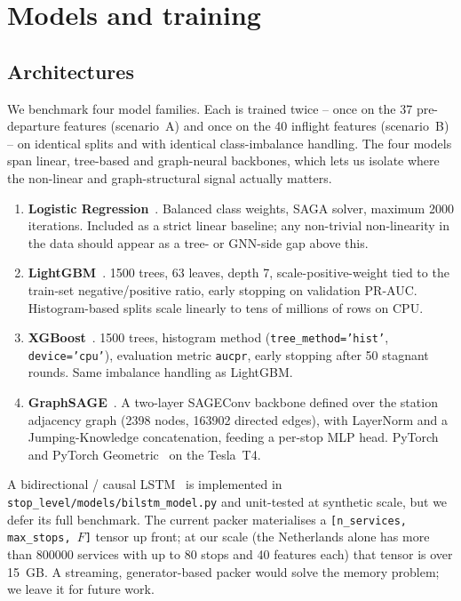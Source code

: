 \section{Models and training}
\label{sec:models}

\subsection{Architectures}

We benchmark four model families. Each is trained twice -- once on the 37 pre-departure features (scenario~A) and once on the 40 inflight features (scenario~B) -- on identical splits and with identical class-imbalance handling. The four models span linear, tree-based and graph-neural backbones, which lets us isolate where the non-linear and graph-structural signal actually matters.

\begin{enumerate}
    \item \textbf{Logistic Regression}~\cite{pedregosa2011scikit}. Balanced class weights, SAGA solver, maximum 2000 iterations. Included as a strict linear baseline; any non-trivial non-linearity in the data should appear as a tree- or GNN-side gap above this.
    \item \textbf{LightGBM}~\cite{ke2017lightgbm}. 1500 trees, 63 leaves, depth 7, scale-positive-weight tied to the train-set negative/positive ratio, early stopping on validation PR-AUC. Histogram-based splits scale linearly to tens of millions of rows on CPU.
    \item \textbf{XGBoost}~\cite{chen2016xgboost}. 1500 trees, histogram method (\texttt{tree\_method='hist'}, \texttt{device='cpu'}), evaluation metric \texttt{aucpr}, early stopping after 50 stagnant rounds. Same imbalance handling as LightGBM.
    \item \textbf{GraphSAGE}~\cite{hamilton2017inductive}. A two-layer SAGEConv backbone defined over the station adjacency graph (\num{2398} nodes, \num{163902} directed edges), with LayerNorm and a Jumping-Knowledge concatenation, feeding a per-stop MLP head. PyTorch~\cite{paszke2019pytorch} and PyTorch Geometric~\cite{fey2019fast} on the Tesla~T4.
\end{enumerate}

A bidirectional / causal LSTM~\cite{schuster1997bidirectional,hochreiter1997long} is implemented in \texttt{stop\_level/models/bilstm\_model.py} and unit-tested at synthetic scale, but we defer its full benchmark. The current packer materialises a \texttt{[n\_services, max\_stops, $F$]} tensor up front; at our scale (the Netherlands alone has more than \num{800000} services with up to 80 stops and 40 features each) that tensor is over \SI{15}{GB}. A streaming, generator-based packer would solve the memory problem; we leave it for future work.

